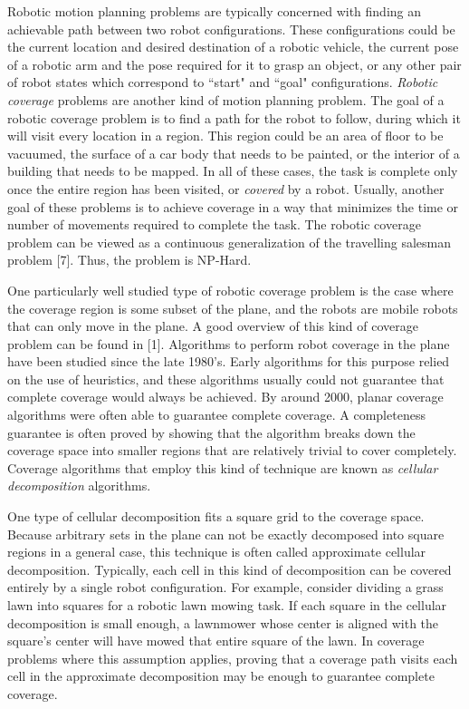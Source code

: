 \documentclass[letterpaper, 12pt, leqno]{report}
\begin{document}
Robotic motion planning problems are typically concerned with finding an achievable path between two robot configurations. These configurations could be the current location and desired destination of a robotic vehicle, the current pose of a robotic arm and the pose required for it to grasp an object, or any other pair of robot states which correspond to ``start" and ``goal" configurations. \textit{Robotic coverage} problems are another kind of motion planning problem. The goal of a robotic coverage problem is to find a path for the robot to follow, during which it will visit every location in a region. This region could be an area of floor to be vacuumed, the surface of a car body that needs to be painted, or the interior of a building that needs to be mapped. In all of these cases, the task is complete only once the entire region has been visited, or \textit{covered} by a robot. Usually, another goal of these problems is to achieve coverage in a way that minimizes the time or number of movements required to complete the task.
The robotic coverage problem can be viewed as a continuous generalization of the travelling salesman problem [7]. Thus, the problem is NP-Hard. 

One particularly well studied type of robotic coverage problem is the case where the coverage region is some subset of the plane, and the robots are mobile robots that can only move in the plane. A good overview of this kind of coverage problem can be found in [1]. Algorithms to perform robot coverage in the plane have been studied since the late 1980's. Early algorithms for this purpose relied on the use of heuristics, and these algorithms usually could not guarantee that complete coverage would always be achieved. By around 2000, planar coverage algorithms were often able to guarantee complete coverage. A completeness guarantee is often proved by showing that the algorithm breaks down the coverage space into smaller regions that are relatively trivial to cover completely. Coverage algorithms that employ this kind of technique are known as \textit{cellular decomposition} algorithms.

One type of cellular decomposition fits a square grid to the coverage space. Because arbitrary sets in the plane can not be exactly decomposed into square regions in a general case, this technique is often called approximate cellular decomposition. Typically, each cell in this kind of decomposition can be covered entirely by a single robot configuration. For example, consider dividing a grass lawn into squares for a robotic lawn mowing task. If each square in the cellular decomposition is small enough, a lawnmower whose center is aligned with the square's center will have mowed that entire square of the lawn. In coverage problems where this assumption applies, proving that a coverage path visits each cell in the approximate decomposition may be enough to guarantee complete coverage.
\end{document}
